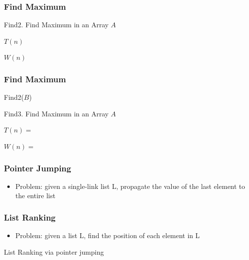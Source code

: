\documentclass[12pt,aspectratio=169]{beamer}
\begin{document}
\begin{frame}\frametitle{Find Maximum}
\begin{algorithm}[H]
\caption{Find2.    
Find Maximum in an Array $A$}
\end{algorithm}
$T(n)$ 

$W(n)$ 
\end{frame}


\begin{frame}\frametitle{Find Maximum}
\begin{algorithm}[H]
Find2($B$)\;
\caption{Find3.    
Find Maximum in an Array $A$}
\end{algorithm}
$T(n) =$

$W(n) =$
\end{frame}

\begin{frame}\frametitle{Pointer Jumping}

  \begin{itemize}[<.->]
  \item
    Problem: given a single-link list L, propagate the value of the last
      element to the entire list
  \end{itemize}
\begin{algorithm}[H]
\end{algorithm}
\end{frame}

\begin{frame}\frametitle{List Ranking}
  \begin{itemize}[<.->]
  \item
    Problem: given a list L, find the position of each element in L
  \end{itemize}
\begin{algorithm}[H]
\caption{List Ranking via pointer jumping}
\end{algorithm}
\end{frame}
\end{document}
